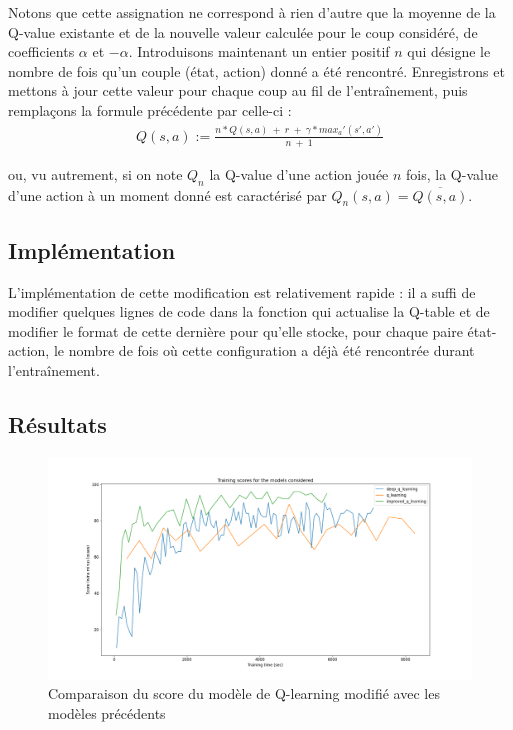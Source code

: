 \documentclass[french]{article}
\begin{document}
    Notons que cette assignation ne correspond à rien d'autre que la moyenne de la Q-value existante et de la nouvelle valeur calculée pour le coup considéré, de coefficients $\alpha$ et $-\alpha$. Introduisons maintenant un entier positif $n$ qui désigne le nombre de fois qu'un couple (état, action) donné a été rencontré. Enregistrons et mettons à jour cette valeur pour chaque coup au fil de l'entraînement, puis remplaçons la formule précédente par celle-ci :
    \begin{align*}
        Q(s,a) := \frac{n*Q(s,a) \:+ \:r \:+ \:\gamma * max_a'(s',a')}{n\:+\:1}
    \end{align*}

    ou, vu autrement, si on note $Q_n$ la Q-value d'une action jouée $n$ fois, la Q-value d'une action à un moment donné est caractérisé par $Q_n(s,a) = \overline{Q(s,a)}$.

    \subsection{Implémentation}

    L'implémentation de cette modification est relativement rapide : il a suffi de modifier quelques lignes de code dans la fonction qui actualise la Q-table et de modifier le format de cette dernière pour qu'elle stocke, pour chaque paire état-action, le nombre de fois où cette configuration a déjà été rencontrée durant l'entraînement.
    \subsection{Résultats}

    \begin{figure}[h]
        \includegraphics[width=12cm]{improved_q_learning_metrics}
        \centering
        \caption{Comparaison du score du modèle de Q-learning modifié avec les modèles précédents}
        \centering
    \end{figure}
\end{document}
